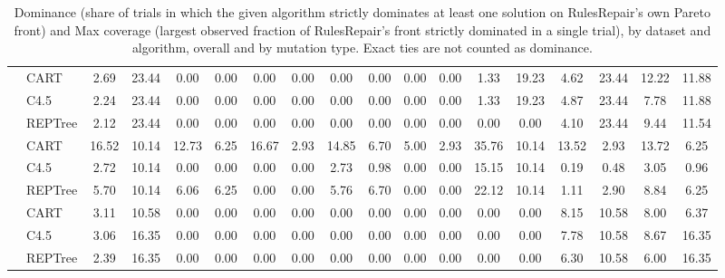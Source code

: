 \begin{table}[tb]
{\begin{tabular}{llcccccccccccccccc}
\addlinespace
\multirow{3}{*}{\textit{Prepaid Travel Costs}} & CART & 2.69 & 23.44 & 0.00 & 0.00 & 0.00 & 0.00 & 0.00 & 0.00 & 0.00 & 0.00 & 1.33 & 19.23 & 4.62 & 23.44 & 12.22 & 11.88 \\
 & C4.5 & 2.24 & 23.44 & 0.00 & 0.00 & 0.00 & 0.00 & 0.00 & 0.00 & 0.00 & 0.00 & 1.33 & 19.23 & 4.87 & 23.44 & 7.78 & 11.88 \\
 & REPTree & 2.12 & 23.44 & 0.00 & 0.00 & 0.00 & 0.00 & 0.00 & 0.00 & 0.00 & 0.00 & 0.00 & 0.00 & 4.10 & 23.44 & 9.44 & 11.54 \\
\addlinespace
\multirow{3}{*}{\textit{Hospital Billing}} & CART & 16.52 & 10.14 & 12.73 & 6.25 & 16.67 & 2.93 & 14.85 & 6.70 & 5.00 & 2.93 & 35.76 & 10.14 & 13.52 & 2.93 & 13.72 & 6.25 \\
 & C4.5 & 2.72 & 10.14 & 0.00 & 0.00 & 0.00 & 0.00 & 2.73 & 0.98 & 0.00 & 0.00 & 15.15 & 10.14 & 0.19 & 0.48 & 3.05 & 0.96 \\
 & REPTree & 5.70 & 10.14 & 6.06 & 6.25 & 0.00 & 0.00 & 5.76 & 6.70 & 0.00 & 0.00 & 22.12 & 10.14 & 1.11 & 2.90 & 8.84 & 6.25 \\
\addlinespace
\multirow{3}{*}{\textit{International Declarations}} & CART & 3.11 & 10.58 & 0.00 & 0.00 & 0.00 & 0.00 & 0.00 & 0.00 & 0.00 & 0.00 & 0.00 & 0.00 & 8.15 & 10.58 & 8.00 & 6.37 \\
 & C4.5 & 3.06 & 16.35 & 0.00 & 0.00 & 0.00 & 0.00 & 0.00 & 0.00 & 0.00 & 0.00 & 0.00 & 0.00 & 7.78 & 10.58 & 8.67 & 16.35 \\
 & REPTree & 2.39 & 16.35 & 0.00 & 0.00 & 0.00 & 0.00 & 0.00 & 0.00 & 0.00 & 0.00 & 0.00 & 0.00 & 6.30 & 10.58 & 6.00 & 16.35 \\
\bottomrule
\end{tabular}
}
\vspace{2pt}
\caption{Dominance (share of trials in which the given algorithm strictly dominates at least one solution on RulesRepair's own Pareto front) and Max coverage (largest observed fraction of RulesRepair's front strictly dominated in a single trial), by dataset and algorithm, overall and by mutation type. Exact ties are not counted as dominance.}
\label{tab:cart_point_dominance_coverage}
\end{table}

